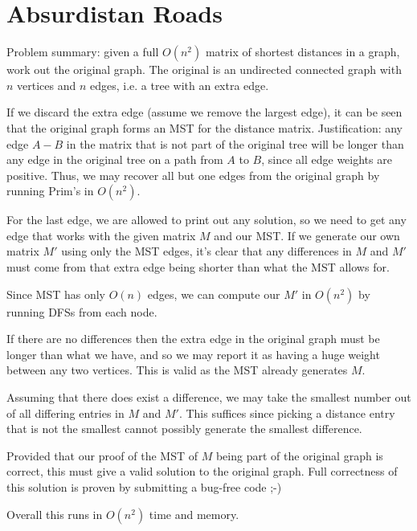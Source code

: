 \section{Absurdistan Roads}

Problem summary: given a full $O(n^2)$ matrix of shortest distances in a graph,
work out the original graph. The original is an undirected connected graph with
$n$ vertices and $n$ edges, i.e. a tree with an extra edge.

If we discard the extra edge (assume we remove the largest edge), it can be seen
that the original graph forms an MST for the distance matrix. Justification: any
edge $A-B$ in the matrix that is not part of the original tree will be longer
than any edge in the original tree on a path from $A$ to $B$, since all edge
weights are positive. Thus, we may recover all but one edges from the original
graph by running Prim's in $O(n^2)$.

For the last edge, we are allowed to print out any solution, so we need to get
any edge that works with the given matrix $M$ and our MST. If we generate our
own matrix $M'$ using only the MST edges, it's clear that any differences in $M$
and $M'$ must come from that extra edge being shorter than what the MST allows
for.

Since MST has only $O(n)$ edges, we can compute our $M'$ in $O(n^2)$ by running
DFSs from each node.

If there are no differences then the extra edge in the original graph must be
longer than what we have, and so we may report it as having a huge weight
between any two vertices. This is valid as the MST already generates $M$.

Assuming that there does exist a difference, we may take the smallest number out
of all differing entries in $M$ and $M'$. This suffices since picking a distance
entry that is not the smallest cannot possibly generate the smallest difference.

Provided that our proof of the MST of $M$ being part of the original graph is
correct, this must give a valid solution to the original graph. Full correctness
of this solution is proven by submitting a bug-free code ;-)

Overall this runs in $O(n^2)$ time and memory.
